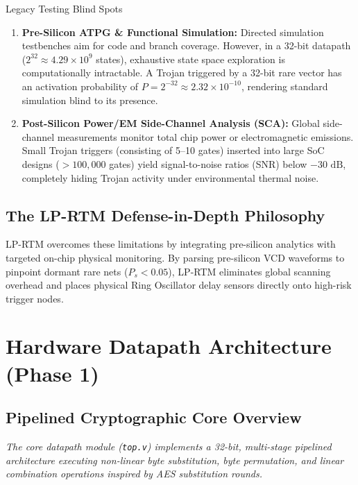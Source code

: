 \documentclass[11pt,a4paper,oneside]{book}
\begin{document}
\begin{securitybox}{Legacy Testing Blind Spots}
\begin{enumerate}[leftmargin=1.2em]
  \item \textbf{Pre-Silicon ATPG \& Functional Simulation:} Directed simulation testbenches aim for code and branch coverage. However, in a 32-bit datapath ($2^{32} \approx 4.29 \times 10^9$ states), exhaustive state space exploration is computationally intractable. A Trojan triggered by a 32-bit rare vector has an activation probability of $P = 2^{-32} \approx 2.32 \times 10^{-10}$, rendering standard simulation blind to its presence.
  \item \textbf{Post-Silicon Power/EM Side-Channel Analysis (SCA):} Global side-channel measurements monitor total chip power or electromagnetic emissions. Small Trojan triggers (consisting of 5--10 gates) inserted into large SoC designs ($>100,000$ gates) yield signal-to-noise ratios (SNR) below $-30\text{~dB}$, completely hiding Trojan activity under environmental thermal noise.
\end{enumerate}
\end{securitybox}

\section{The LP-RTM Defense-in-Depth Philosophy}

LP-RTM overcomes these limitations by integrating pre-silicon analytics with targeted on-chip physical monitoring. By parsing pre-silicon VCD waveforms to pinpoint dormant rare nets ($P_s < 0.05$), LP-RTM eliminates global scanning overhead and places physical Ring Oscillator delay sensors directly onto high-risk trigger nodes.

\chapter{Hardware Datapath Architecture (Phase 1)}

\section{Pipelined Cryptographic Core Overview}

{\itshape
The core datapath module (\texttt{top.v}) implements a 32-bit, multi-stage pipelined architecture executing non-linear byte substitution, byte permutation, and linear combination operations inspired by AES substitution rounds.
}
\end{document}
